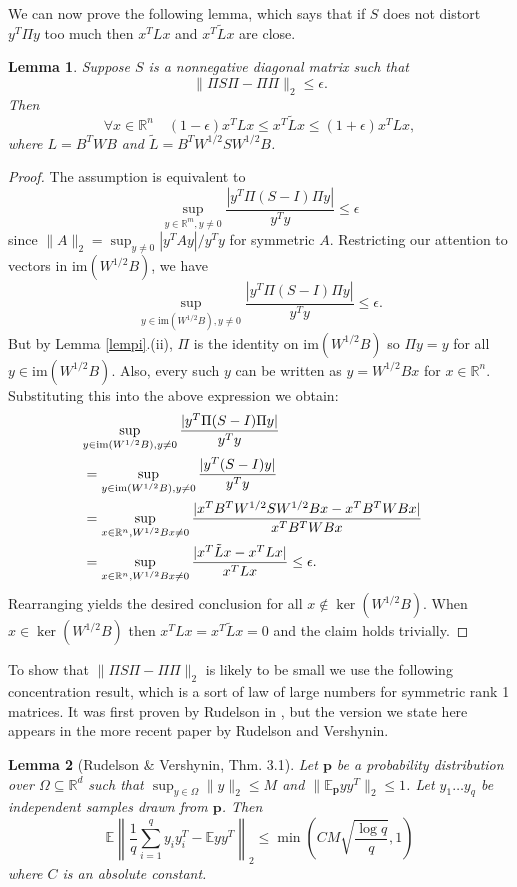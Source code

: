 \documentclass[11pt]{article}
\newtheorem{lem}{Lemma}
\newcommand{\im}{\mathrm{im}}
\newcommand{\E}{\mathbb{E}}
\newcommand{\R}{\mathbb{R}}
\begin{document}
We can now prove the following lemma, which says that if $S$ does not
distort $y^T\Pi y$ too much then $x^TLx$ and $x^T\tilde{L}x$ are close.
\begin{lem}\label{lemS} Suppose $S$ is a nonnegative diagonal matrix such that
\[\|\Pi S \Pi - \Pi \Pi\|_2\le \epsilon.\] 
Then 
\[ \forall x\in\R^n\quad(1-\epsilon)x^TLx\le x^T\tilde{L}x\le (1+\epsilon)
x^TLx,\]
where $L=B^TWB$ and $\tilde{L}=B^TW^{1/2}SW^{1/2}B$.
\end{lem}
\begin{proof}
The assumption is equivalent to
\[\sup_{y\in \R^m, y\neq 0}\frac{|y^T\Pi (S - I)\Pi y|}{y^Ty} \le \epsilon\]
since $\|A\|_2=\sup_{y\neq 0} |y^TAy|/y^Ty$ for symmetric $A$. Restricting our
attention to vectors in $\im(W^{1/2}B)$, we have
\[\sup_{y\in \im(W^{1/2}B), y\neq 0} \frac{|y^T\Pi(S-I)\Pi y|}{y^Ty} \le \epsilon.\]
But by Lemma \ref{lempi}.(ii), $\Pi$ is the identity on $\im(W^{1/2}B)$ so $\Pi
y=y$ for all $y\in\im(W^{1/2}B)$. Also, every such $y$ can be written as $y=W^{1/2}Bx$ for
$x\in\R^n$. Substituting this into the above expression we obtain:
\begin{align*}
\lefteqn{\sup_{y\in \im(W^{1/2}B), y\neq 0} \frac{|y^T\Pi(S-I)\Pi y|}{y^Ty}}\\
 &= \sup_{y\in
\im(W^{1/2}B),y\neq 0} \frac{|y^T(S-I)y|}{y^Ty}
\\ &=\sup_{x\in\R^n, W^{1/2}Bx\neq 0}\frac{|x^TB^TW^{1/2}SW^{1/2}Bx-x^TB^TWBx|}{x^TB^TWBx}
\\&=\sup_{x\in\R^n, W^{1/2}Bx\neq
0}\frac{|x^T\tilde{L}x-x^TLx|}{x^TLx}\le\epsilon. \end{align*} 
Rearranging yields the desired conclusion for all $x\notin\ker(W^{1/2}B)$.
When $x\in\ker(W^{1/2}B)$ then $x^TLx=x^T\tilde{L}x=0$ and the claim holds trivially.\end{proof}

To show that $\|\Pi S\Pi-\Pi\Pi\|_2$ is likely to be small we use the following concentration
result, which is a sort of law of large numbers for symmetric rank 1 matrices. It was first proven
by Rudelson in \cite{rudl}, but the version we state here appears in the more
recent paper \cite{rudversh} by Rudelson and Vershynin.  
\begin{lem}[Rudelson \& Vershynin, \cite{rudversh} Thm. 3.1] 
\label{lemrud} Let $\mathbf{p}$ be a probability distribution over
$\Omega\subseteq\R^d$ such
that $\sup_{y\in\Omega}\|y\|_2\le M$ and $\|\E_{\mathbf{p}} yy^T\|_2\le 1$. Let
$y_1\ldots y_q$ be independent samples drawn from $\mathbf{p}$. Then 
\[\E \left\|\frac{1}{q}\sum_{i=1}^q y_iy_i^T-\E yy^T\right\|_2\le
\min\left(CM\sqrt{\frac{\log q}{q}},1\right)\]
where $C$ is an  absolute constant.
\end{lem}
\end{document}

